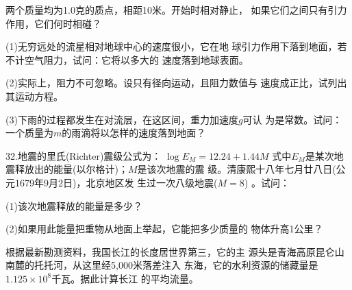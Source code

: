\begin{exercises}
\exercise 两个质量均为1.0克的质点，相距10米。开始时相对静止，
如果它们之间只有引力作用，它们何时相碰？

\exercise (1)无穷远处的流星相对地球中心的速度很小，它在地
球引力作用下落到地面，若不计空气阻力，试问：它将以多大的
速度落到地球表面。

(2)实际上，阻力不可忽略。设只有径向运动，且阻力数值与
速度成正比，试列出其运动方程。

(3)下雨的过程都发生在对流层，在这区间，重力加速度$ g $可认
为是常数。试问：一个质量为$ m $的雨滴将以怎样的速度落到地面？

32.地震的里氏(Richter)震级公式为：
$ \log E _ { M } = 12.24 + 1.44 M $
式中$ E _ { M } $是某次地震释放出的能量(以尔格计)；$ M $是该次地震的震
级。清康熙十八年七月廿八日(公元1679年9月2日)，北京地区发
生过一次八级地震($ M = 8 $) 。试问：

(1)该次地震释放的能量是多少？

(2)如果用此能量把重物从地面上举起，它能把多少质量的
物体升高1公里？

\exercise 根据最新勘测资料，我国长江的长度居世界第三，它的主
源头是青海高原昆仑山南麓的托托河，从这里经5,000米落差注入
东海，它的水利资源的储藏量是$ 1.125 \times 10 ^ { 8 } $千瓦。据此计算长江
的平均流量。

\end{exercises}